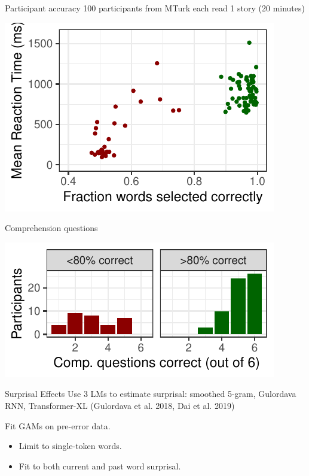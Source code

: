 \documentclass[12pt, xcolor=beamer,table,usenames,dvipsnames, ignorenonframetext, ngerman]{beamer}
\begin{document}
\begin{frame}{Participant accuracy}
100 participants from MTurk each read 1 story (20 minutes) \pause
\begin{center}
\includegraphics[width=.8\textwidth]{../error.pdf}
\end{center}
\end{frame}
\begin{frame}{Comprehension questions}
\begin{center} \pause
\includegraphics[width=.8\textwidth]{../comp.pdf}
\end{center}
\end{frame}



\begin{frame}{Surprisal Effects}
Use 3 LMs to estimate surprisal: smoothed 5-gram, Gulordava RNN, Transformer-XL (Gulordava et al. 2018, Dai et al. 2019)
\pause


Fit GAMs on pre-error data.
\begin{itemize}
	\item Limit to single-token words.
	\item Fit to both current and past word surprisal.
\end{itemize}

\end{frame}
\end{document}
